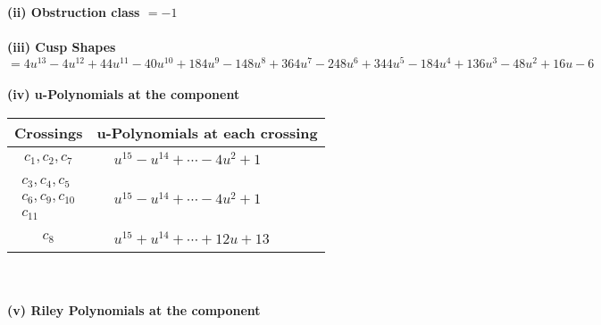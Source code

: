 \documentclass[1p]{elsarticle_modified}
\theoremstyle{definition}
\begin{document}
\flushleft \textbf{(ii) Obstruction class $= -1$}\\~\\
\flushleft \textbf{(iii) Cusp Shapes $= 4 u^{13}-4 u^{12}+44 u^{11}-40 u^{10}+184 u^9-148 u^8+364 u^7-248 u^6+344 u^5-184 u^4+136 u^3-48 u^2+16 u-6$}\\~\\
\newpage\renewcommand{\arraystretch}{1}
\flushleft \textbf{(iv) u-Polynomials at the component}\newline \\
\begin{tabular}{m{50pt}|m{274pt}}
Crossings & \hspace{64pt}u-Polynomials at each crossing \\
\hline $$\begin{aligned}c_{1},c_{2},c_{7}\end{aligned}$$&$\begin{aligned}
&u^{15}- u^{14}+\cdots-4 u^2+1
\end{aligned}$\\
\hline $$\begin{aligned}c_{3},c_{4},c_{5}\\c_{6},c_{9},c_{10}\\c_{11}\end{aligned}$$&$\begin{aligned}
&u^{15}- u^{14}+\cdots-4 u^2+1
\end{aligned}$\\
\hline $$\begin{aligned}c_{8}\end{aligned}$$&$\begin{aligned}
&u^{15}+u^{14}+\cdots+12 u+13
\end{aligned}$\\
\hline
\end{tabular}\\~\\
\newpage\renewcommand{\arraystretch}{1}
\flushleft \textbf{(v) Riley Polynomials at the component}\newline \\
\end{document}
